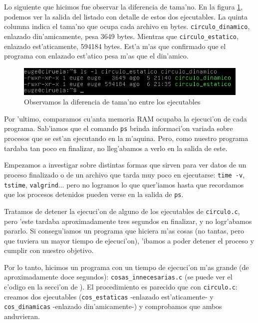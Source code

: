 \documentclass[11pt]{article}
\begin{document}
		Lo siguiente que hicimos fue observar la diferencia de tama'no. En la figura \ref{fig:bytes_circulos}, podemos ver la salida del listado con detalle de estos dos ejecutables. La quinta columna indica el tama'no que ocupa cada archivo en bytes. \texttt{circulo\_dinamico}, enlazado din'amicamente, pesa 3649 bytes. Mientras que \texttt{circulo\_estatico}, enlazado est'aticamente, 594184 bytes. Est'a m'as que confirmado que el programa con enlazado est'atico pesa m'as que el din'amico.


		\begin{figure}[H]
    			\centering
    			\includegraphics[scale=0.8]{Images/Seccion 1/bytes_circulos.png}
    			\caption{Observamos la diferencia de tama'no entre los ejecutables}
    			\label{fig:bytes_circulos}
		\end{figure}

		Por 'ultimo, comparamos cu'anta memoria RAM ocupaba la ejecuci'on de cada programa. Sab'iamos que el comando \texttt{ps} %
		brinda informaci'on variada sobre procesos que se est'an ejecutando en la m'aquina. Pero, como nuestro programa tardaba tan poco en finalizar, no lleg'abamos a verlo en la salida de este.

		Empezamos a investigar sobre distintas formas que sirven para ver datos de un proceso finalizado o de un archivo que tarda muy poco en ejecutarse: \texttt{time -v}, \texttt{tstime}, \texttt{valgrind}... pero no logramos lo que quer'iamos hasta que recordamos que los procesos detenidos pueden verse en la salida de \texttt{ps}.

		Tratamos de detener la ejecuci'on de alguno de los ejecutables %
		de \texttt{circulo.c}, pero 'este tardaba aproximadamente tres segundos en finalizar, y no logr'abamos pararlo. Si consegu'iamos un programa que hiciera m'as cosas (no tantas, pero que tuviera un mayor tiempo de ejecuci'on), 'ibamos a poder detener el proceso y cumplir con nuestro objetivo.

		Por lo tanto, hicimos un programa con un tiempo de ejecuci'on m'as grande (de aproximadamente doce segundos): \texttt{cosas\_innecesarias.c} \label{cosas_innecesarias} (se puede ver el c'odigo en la secci'on de \texttt{}). El procedimiento es parecido que con \texttt{circulo.c}: creamos dos ejecutables (\texttt{cos\_estaticas} -enlazado est'aticamente- y \texttt{cos\_dinamicas} -enlazado din'amicamente-) y comprobamos que ambos anduvieran.
\end{document}
